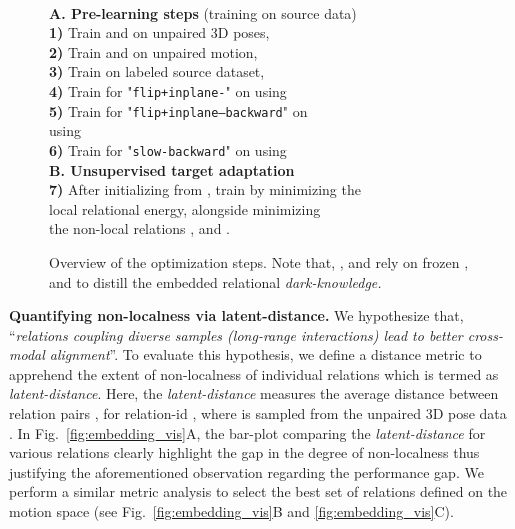 \documentclass{article}
\begin{document}
\begin{wrapfigure}[17]{r}{0.55\linewidth} \begin{minipage}{0.55\textwidth}
\vspace{-5mm}

\begin{algorithm}[H]{\small
\hrulefill\\
\textbf{A. Pre-learning steps} (training on source data) \\
 \textbf{1)} Train  and  on unpaired 3D poses,  \\
 \textbf{2)} Train  and  on unpaired motion, \\
 \textbf{3)} Train  on labeled source dataset, \\
 \textbf{4)} Train  for "\texttt{flip+inplane-}" on  using \\
 \textbf{5)} Train  for "\texttt{flip+inplane--backward}" on  \\ 
 using \\
 \textbf{6)} Train  for "\texttt{slow-backward}" on  using \\
\vspace{1mm}
\textbf{B. Unsupervised target adaptation} \\
\vspace{0.5mm}
 \textbf{7)} After initializing  from , train  by minimizing the \\
 local relational energy,  alongside minimizing \\
 the non-local relations ,  and .
\vspace{-2mm}
\\\hrulefill
}
\caption{ Overview of the optimization steps. Note that, ,  and  rely on frozen ,  and  to distill the embedded relational \textit{dark-knowledge.}}
\label{algo:1}

\end{algorithm}
\end{minipage}
\end{wrapfigure}


\textbf{Quantifying non-localness via latent-distance.} We hypothesize that, ``\textit{relations coupling diverse samples (long-range interactions) lead to better cross-modal alignment}''. To evaluate this hypothesis, we define a distance metric to apprehend the extent of non-localness of individual relations which is termed as \textit{latent-distance}. Here, the \textit{latent-distance}  measures the average distance between relation pairs , for relation-id , where  is sampled from the unpaired 3D pose data . In Fig.~\ref{fig:embedding_vis}{\color{red}A}, the  bar-plot comparing the \textit{latent-distance} for various relations
clearly highlight the gap in the degree of non-localness thus justifying the aforementioned observation regarding the performance gap. We perform a similar metric analysis to select the best set of relations defined on the motion space  (see Fig.~\ref{fig:embedding_vis}{\color{red}B} and \ref{fig:embedding_vis}{\color{red}C}). 
\end{document}
